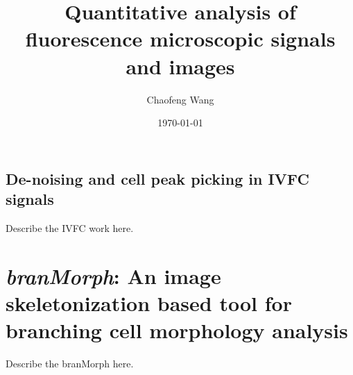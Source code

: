 \documentclass[openright,twoside,a4paper,12pt]{book}
\title{Quantitative analysis of fluorescence microscopic signals and images}
\author{Chaofeng Wang}
\date{\today}
\begin{document}

\maketitle

\frontmatter



% 


\wcfToc

\makeatletter\@openrightfalse
\wcfLot
\wcfLof
% 
\printglossary[type=\acronymtype,style=long]

\@openrighttrue\makeatother

\mainmatter

\begin{refsection}





\part{De-noising and cell peak picking in IVFC signals}


% 
Describe the IVFC work here.

\end{refsection}


\part{\emph{branMorph}: An image skeletonization based tool for branching cell morphology analysis}
\begin{refsection}

% 
Describe the branMorph here.

\end{refsection}
\end{document}
